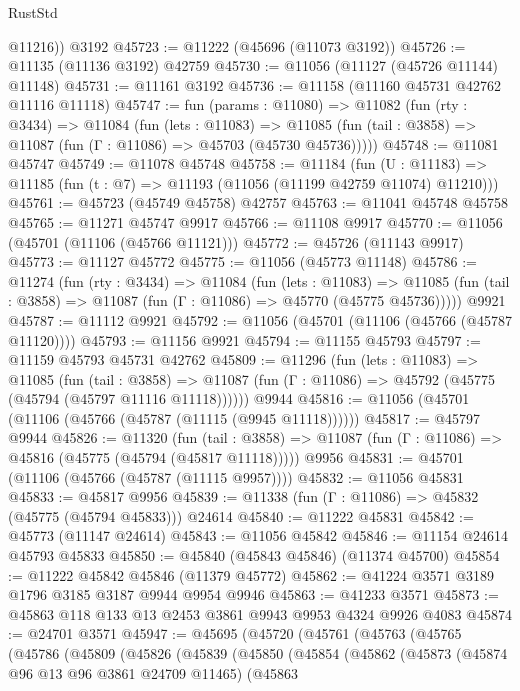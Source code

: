 \begin{lexlean}{RustStd}
\begin{coremodule}
        @11216))
    @3192
@45723 := @11222 (@45696 (@11073 @3192))
@45726 := @11135 (@11136 @3192) @42759
@45730 := @11056 (@11127 (@45726 @11144) @11148)
@45731 := @11161 @3192
@45736 := @11158 (@11160 @45731 @42762 @11116 @11118)
@45747 := fun (params : @11080) =>
  @11082
    (fun (rty : @3434) =>
    @11084
      (fun (lets : @11083) =>
      @11085 (fun (tail : @3858) => @11087 (fun (Γ : @11086) => @45703 (@45730 @45736)))))
@45748 := @11081 @45747
@45749 := @11078 @45748
@45758 := @11184
    (fun (U : @11183) => @11185 (fun (t : @7) => @11193 (@11056 (@11199 @42759 @11074) @11210)))
@45761 := @45723 (@45749 @45758) @42757
@45763 := @11041 @45748 @45758
@45765 := @11271 @45747 @9917
@45766 := @11108 @9917
@45770 := @11056 (@45701 (@11106 (@45766 @11121)))
@45772 := @45726 (@11143 @9917)
@45773 := @11127 @45772
@45775 := @11056 (@45773 @11148)
@45786 := @11274
    (fun (rty : @3434) =>
    @11084
      (fun (lets : @11083) =>
      @11085 (fun (tail : @3858) => @11087 (fun (Γ : @11086) => @45770 (@45775 @45736)))))
    @9921
@45787 := @11112 @9921
@45792 := @11056 (@45701 (@11106 (@45766 (@45787 @11120))))
@45793 := @11156 @9921
@45794 := @11155 @45793
@45797 := @11159 @45793 @45731 @42762
@45809 := @11296
    (fun (lets : @11083) =>
    @11085
      (fun (tail : @3858) =>
      @11087 (fun (Γ : @11086) => @45792 (@45775 (@45794 (@45797 @11116 @11118))))))
    @9944
@45816 := @11056 (@45701 (@11106 (@45766 (@45787 (@11115 (@9945 @11118))))))
@45817 := @45797 @9944
@45826 := @11320
    (fun (tail : @3858) => @11087 (fun (Γ : @11086) => @45816 (@45775 (@45794 (@45817 @11118)))))
    @9956
@45831 := @45701 (@11106 (@45766 (@45787 (@11115 @9957))))
@45832 := @11056 @45831
@45833 := @45817 @9956
@45839 := @11338 (fun (Γ : @11086) => @45832 (@45775 (@45794 @45833))) @24614
@45840 := @11222 @45831
@45842 := @45773 (@11147 @24614)
@45843 := @11056 @45842
@45846 := @11154 @24614 @45793 @45833
@45850 := @45840 (@45843 @45846) (@11374 @45700)
@45854 := @11222 @45842 @45846 (@11379 @45772)
@45862 := @41224 @3571 @3189 @1796 @3185 @3187 @9944 @9954 @9946
@45863 := @41233 @3571
@45873 := @45863 @118 @133 @13 @2453 @3861 @9943 @9953 @4324 @9926 @4083
@45874 := @24701 @3571
@45947 := @45695
    (@45720
      (@45761
        (@45763
          (@45765
            (@45786
              (@45809
                (@45826
                  (@45839
                    (@45850
                      (@45854
                        (@45862
                          (@45873
                            (@45874 @96 @13 @96 @3861 @24709 @11465)
                            (@45863

\end{coremodule}
\end{lexlean}
